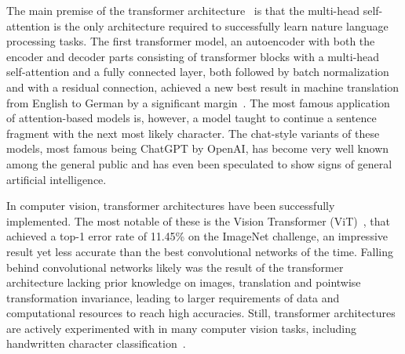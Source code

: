 \documentclass[english,twoside,openright]{UH_DS_MSc}
\begin{document}
The main premise of the transformer architecture~\cite{attention_is_all_you_need} is that the multi-head self-attention 
is the only architecture required to successfully learn nature language processing tasks. The first transformer model,
an autoencoder with both the encoder and decoder parts consisting of transformer blocks with a multi-head self-attention and 
a fully connected layer, both followed by batch normalization and with a residual connection, achieved a new best 
result in machine translation from English to German by a significant margin~\cite{attention_is_all_you_need}.
The most famous application of attention-based models is, however, a model taught to continue a sentence fragment with the next most 
likely character. The chat-style variants of these models, most famous being ChatGPT by OpenAI, has become very well known among the general public and 
has even been speculated to show signs of general artificial intelligence.

In computer vision, transformer architectures have been successfully implemented.
The most notable of these is the Vision Transformer (ViT)~\cite{vit}, that achieved a top-1 error rate of
11.45\% on the ImageNet challenge, an impressive result yet less accurate than the best convolutional networks of the time.
Falling behind convolutional networks likely was the result of the transformer architecture lacking prior knowledge on images,
translation and pointwise transformation invariance, leading to larger requirements of data and computational resources 
to reach high accuracies. Still, transformer architectures are actively experimented with in many computer vision tasks, 
including handwritten character classification~\cite{9thuonPalm}.
\end{document}
